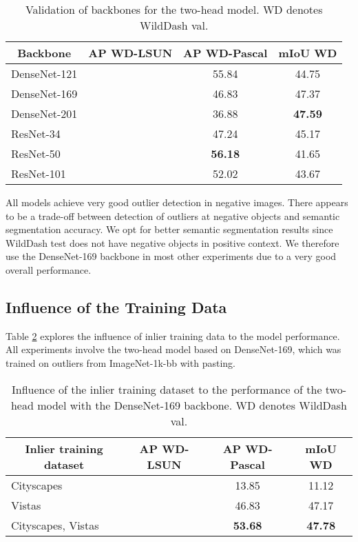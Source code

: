 \documentclass[runningheads]{llncs}
\begin{document}
\begin{table}[htb]
\centering
\caption{Validation of backbones
  for the two-head model.
WD denotes WildDash val.
  }
\label{table:backbone_val}
\begin{tabular}{|c||c|c|c|}
  \hline
  Backbone & 
    \multicolumn{1}{c|}{AP WD-LSUN } & 
    \multicolumn{1}{c|}{AP WD-Pascal} &
    \multicolumn{1}{c|}{mIoU WD}\\
 \hline
 \hline
  \multicolumn{1}{|l||}{DenseNet-121} &  & 55.84 & 44.75 \\
 \hline
  \multicolumn{1}{|l||}{DenseNet-169} &  & 46.83 & 47.37\\
 \hline
  \multicolumn{1}{|l||}{DenseNet-201} &  &	36.88 &	\textbf{47.59} \\
 \hline
  \multicolumn{1}{|l||}{ResNet-34} &  & 47.24 & 45.17\\
 \hline
  \multicolumn{1}{|l||}{ResNet-50} &  & \textbf{56.18} & 41.65 \\
 \hline
  \multicolumn{1}{|l||}{ResNet-101} &  & 52.02 & 43.67 \\
\hline
\end{tabular}
\end{table}



All models achieve very good 
outlier detection in negative images.
There appears to be a trade-off between
detection of outliers at negative objects
and semantic segmentation accuracy.
We opt for better semantic segmentation results
since WildDash test does not have negative objects
in positive context.
We therefore use the DenseNet-169 backbone 
in most other experiments due to 
a very good overall performance.


\subsection{Influence of the Training Data}

Table \ref{table:dataset_results_in}
explores the influence of 
inlier training data 
to the model performance.
All experiments involve the two-head model 
based on DenseNet-169, which was trained on outliers from ImageNet-1k-bb with pasting.

\begin{table}[htb]
\centering
\caption{Influence of
  the inlier training dataset 
  to the performance of the two-head model 
  with the DenseNet-169 backbone.
  WD denotes WildDash val.
}
\label{table:dataset_results_in}
\begin{tabular}{|c||c|c|c|}
  \hline
  Inlier training dataset &
  AP WD-LSUN  & 
  AP WD-Pascal &
  mIoU WD\\
 \hline
  \hline
  \multicolumn{1}{|l||}{Cityscapes} & 
     & 13.85 & 11.12\\
 \hline
  \multicolumn{1}{|l||}{Vistas} & 
     & 46.83 & 47.17 \\
 \hline
  \multicolumn{1}{|l||}{Cityscapes, Vistas} &
     & \textbf{53.68} & \textbf{47.78} \\
\hline
\end{tabular}
\end{table}
\end{document}
